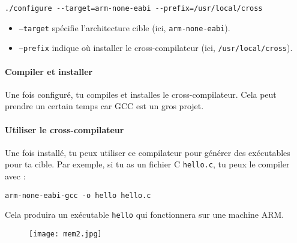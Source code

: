 \documentclass{article}
\begin{document}
\begin{lstlisting}
./configure --target=arm-none-eabi --prefix=/usr/local/cross
\end{lstlisting}

\begin{itemize}
    \item \texttt{--target} spécifie l'architecture cible (ici, \texttt{arm-none-eabi}).
    \item \texttt{--prefix} indique où installer le cross-compilateur (ici, \texttt{/usr/local/cross}).
\end{itemize}

\paragraph{Compiler et installer\\}
Une fois configuré, tu compiles et installes le cross-compilateur. Cela peut prendre un certain temps car GCC est un gros projet.

\paragraph{Utiliser le cross-compilateur\\}
Une fois installé, tu peux utiliser ce compilateur pour générer des exécutables pour ta cible. Par exemple, si tu as un fichier C \texttt{hello.c}, tu peux le compiler avec :

\begin{lstlisting}
arm-none-eabi-gcc -o hello hello.c
\end{lstlisting}

Cela produira un exécutable \texttt{hello} qui fonctionnera sur une machine ARM.
\begin{figure}[h!] %
    \centering %
    \texttt{[image: mem2.jpg]} %
    \label{fig:logo} %
\end{figure}
\end{document}
